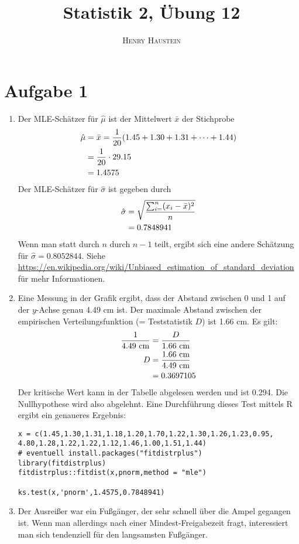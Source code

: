 \documentclass{article}
\title{\textbf{Statistik 2, Übung 12}}
\author{\textsc{Henry Haustein}}
\date{}
\begin{document}
	\maketitle
	
	\section*{Aufgabe 1}
	\begin{enumerate}[label=(\alph*)]
		\item Der MLE-Schätzer für $\hat{\mu}$ ist der Mittelwert $\bar{x}$ der Stichprobe
		\begin{align}
			\hat{\mu} &= \bar{x} = \frac{1}{20}(1.45+1.30+1.31+\dots+1.44) \notag \\
			&= \frac{1}{20}\cdot 29.15 \notag \\
			&= 1.4575 \notag
		\end{align}
		Der MLE-Schätzer für $\hat{\sigma}$ ist gegeben durch
		\begin{align}
			\hat{\sigma} &= \sqrt{\frac{\sum_{i=}^{n} (x_i-\bar{x})^2}{n}} \notag \\
			&= 0.7848941 \notag
		\end{align}
		Wenn man statt durch $n$ durch $n-1$ teilt, ergibt sich eine andere Schätzung für $\hat{\sigma} = 0.8052844$. Siehe \url{https://en.wikipedia.org/wiki/Unbiased_estimation_of_standard_deviation} für mehr Informationen.
		\item Eine Messung in der Grafik ergibt, dass der Abstand zwischen 0 und 1 auf der $y$-Achse genau 4.49 cm ist. Der maximale Abstand zwischen der empirischen Verteilungsfunktion (= Teststatistik $D$) ist 1.66 cm. Es gilt:
		\begin{align}
			\frac{1}{4.49\text{ cm}} &= \frac{D}{1.66\text{ cm}} \notag \\
			D &= \frac{1.66\text{ cm}}{4.49\text{ cm}} \notag \\
			&= 0.3697105 \notag
		\end{align}
		Der kritische Wert kann in der Tabelle abgelesen werden und ist 0.294. Die Nullhypothese wird also abgelehnt. Eine Durchführung dieses Test mittels R ergibt ein genaueres Ergebnis:
		\begin{lstlisting}[style=R]
x = c(1.45,1.30,1.31,1.18,1.20,1.70,1.22,1.30,1.26,1.23,0.95,
4.80,1.28,1.22,1.22,1.12,1.46,1.00,1.51,1.44)
# eventuell install.packages("fitdistrplus")
library(fitdistrplus)
fitdistrplus::fitdist(x,pnorm,method = "mle")
			
ks.test(x,'pnorm',1.4575,0.7848941)
		\end{lstlisting}
		\item Der Ausreißer war ein Fußgänger, der sehr schnell über die Ampel gegangen ist. Wenn man allerdings nach einer Mindest-Freigabezeit fragt, interessiert man sich tendenziell für den langsamsten Fußgänger.
	\end{enumerate}
	
\end{document}
